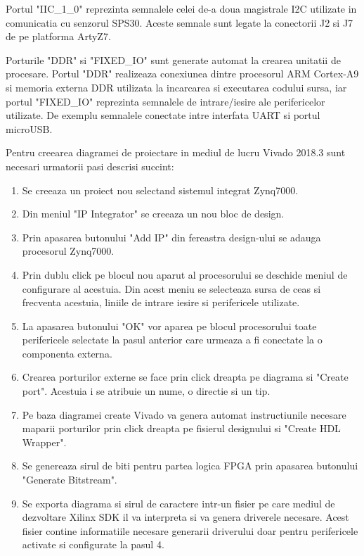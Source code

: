 Portul "IIC\_1\_0" reprezinta semnalele celei de-a doua magistrale I2C utilizate in comunicatia cu senzorul SPS30. Aceste semnale sunt legate la conectorii J2 si J7 
de pe platforma ArtyZ7.

Porturile "DDR" si "FIXED\_IO" sunt generate automat la crearea unitatii de procesare. Portul "DDR" realizeaza conexiunea dintre procesorul ARM Cortex-A9 si memoria 
externa DDR utilizata la incarcarea si executarea codului sursa, iar portul "FIXED\_IO" reprezinta semnalele de intrare/iesire ale perifericelor utilizate. De exemplu 
semnalele conectate intre interfata UART si portul microUSB.

Pentru creearea diagramei de proiectare in mediul de lucru Vivado 2018.3 sunt necesari urmatorii pasi descrisi succint:
\begin{enumerate}
	\item Se creeaza un proiect nou selectand sistemul integrat Zynq7000.
	\item Din meniul "IP Integrator" se creeaza un nou bloc de design.
	\item Prin apasarea butonului "Add IP" din fereastra design-ului se adauga procesorul Zynq7000.
	\item Prin dublu click pe blocul nou aparut al procesorului se deschide meniul de configurare al acestuia. Din acest meniu se selecteaza sursa de ceas si frecventa 
	acestuia, liniile de intrare iesire si perifericele utilizate.
    \item La apasarea butonului "OK" vor aparea pe blocul procesorului toate perifericele selectate la pasul anterior care urmeaza a fi conectate la o componenta externa.
    \item Crearea porturilor externe se face prin click dreapta pe diagrama si "Create port". Acestuia i se atribuie un nume, o directie si un tip.
    \item Pe baza diagramei create Vivado va genera automat instructiunile necesare maparii porturilor prin click dreapta pe fisierul designului si "Create HDL Wrapper".
    \item Se genereaza sirul de biti pentru partea logica FPGA prin apasarea butonului "Generate Bitstream".
    \item Se exporta diagrama si sirul de caractere intr-un fisier pe care mediul de dezvoltare Xilinx SDK il va interpreta si va genera driverele necesare. Acest 
    fisier contine informatiile necesare generarii driverului doar pentru perifericele activate si configurate la pasul 4.
\end{enumerate}

